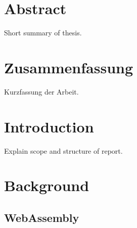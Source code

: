 \documentclass[11pt,a4paper]{book}
\begin{document}
\frontmatter


\chapter*{Abstract}
Short summary of thesis.

\chapter*{Zusammenfassung}
Kurzfassung der Arbeit.

\tableofcontents

\mainmatter
\chapter{Introduction}
\label{s:Introduction}
Explain scope and structure of report.

\chapter{Background}
\section{WebAssembly}
\end{document}
